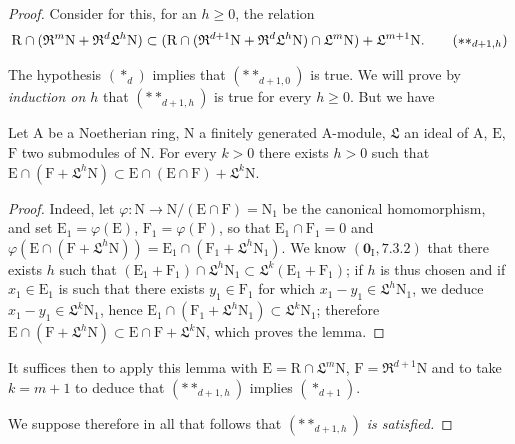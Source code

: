 \begin{proof}
Consider for this, for an $h\geqslant 0$, the relation
\begin{equation}
  \mathrm{R}\cap(\mathfrak{R}^m\mathrm{N}+\mathfrak{R}^d\mathfrak{L}^h\mathrm{N})\subset(\mathrm{R}\cap(\mathfrak{R}^{d+1}\mathrm{N}+\mathfrak{R}^d\mathfrak{L}^h\mathrm{N})\cap\mathfrak{L}^m\mathrm{N})+\mathfrak{L}^{m+1}\mathrm{N}.
  \tag{$**_{d+1,h}$}
\end{equation}

The hypothesis $(*_d)$ implies that $(**_{d+1,0})$ is true. We will prove by \emph{induction on $h$} that $(**_{d+1,h})$ is true for every $h\geqslant 0$. But we have

\begin{lemma}[19.7.1.7]
\label{IV.19.7.1.7}
Let $\mathrm{A}$ be a Noetherian ring, $\mathrm{N}$ a finitely generated $\mathrm{A}$-module, $\mathfrak{L}$ an ideal of $\mathrm{A}$, $\mathrm{E}$, $\mathrm{F}$ two submodules of $\mathrm{N}$. For every $k>0$ there exists $h>0$ such that $\mathrm{E}\cap(\mathrm{F}+\mathfrak{L}^h\mathrm{N})\subset\mathrm{E}\cap(\mathrm{E}\cap\mathrm{F})+\mathfrak{L}^k\mathrm{N}$.
\end{lemma}

\begin{proof}
Indeed, let $\varphi:\mathrm{N}\to\mathrm{N}/(\mathrm{E}\cap\mathrm{F})=\mathrm{N}_1$ be the canonical homomorphism, and set $\mathrm{E}_1=\varphi(\mathrm{E})$, $\mathrm{F}_1=\varphi(\mathrm{F})$, so that $\mathrm{E}_1\cap\mathrm{F}_1=0$ and $\varphi(\mathrm{E}\cap(\mathrm{F}+\mathfrak{L}^h\mathrm{N}))=\mathrm{E}_1\cap(\mathrm{F}_1+\mathfrak{L}^h\mathrm{N}_1)$.
We know $(\mathbf{0}_\mathrm{I},7.3.2)$ that there exists $h$ such that $(\mathrm{E}_1+\mathrm{F}_1)\cap\mathfrak{L}^h\mathrm{N}_1\subset\mathfrak{L}^k(\mathrm{E}_1+\mathrm{F}_1)$; if $h$ is thus chosen and if $x_1\in\mathrm{E}_1$ is such that there exists $y_1\in\mathrm{F}_1$ for which $x_1-y_1\in\mathfrak{L}^h\mathrm{N}_1$, we deduce $x_1-y_1\in\mathfrak{L}^k\mathrm{N}_1$, hence $\mathrm{E}_1\cap(\mathrm{F}_1+\mathfrak{L}^h\mathrm{N}_1)\subset\mathfrak{L}^k\mathrm{N}_1$; therefore $\mathrm{E}\cap(\mathrm{F}+\mathfrak{L}^h\mathrm{N})\subset\mathrm{E}\cap\mathrm{F}+\mathfrak{L}^k\mathrm{N}$, which proves the lemma.
\end{proof}

It suffices then to apply this lemma with $\mathrm{E}=\mathrm{R}\cap\mathfrak{L}^m\mathrm{N}$, $\mathrm{F}=\mathfrak{R}^{d+1}\mathrm{N}$ and to take $k=m+1$ to deduce that $(**_{d+1,h})$ implies $(*_{d+1})$.

We suppose therefore in all that follows that $(**_{d+1,h})$ \emph{is satisfied.}


\end{proof}
